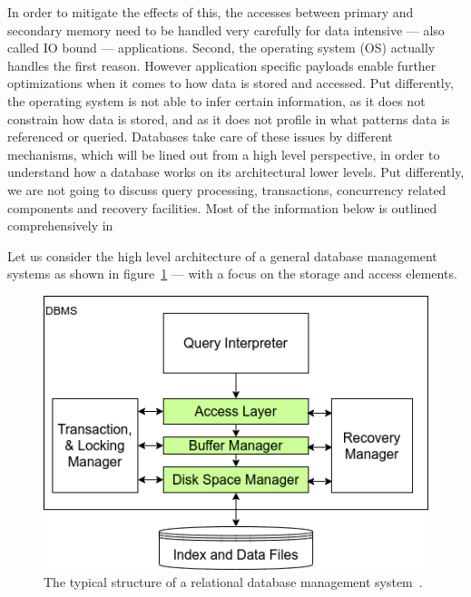     In order to mitigate the effects of this, the accesses between primary and secondary memory need to be handled very carefully for data intensive --- also called IO bound --- applications.
    Second, the operating system (OS) actually handles the first reason. 
    However application specific payloads enable further optimizations when it comes to how data is stored and accessed.
    Put differently, the operating system is not able to infer certain information, as it does not constrain how data is stored, and as it does not profile in what patterns data is referenced or queried.
    Databases take care of these issues by different mechanisms, which will be lined out from a high level perspective, in order to understand how a database works on its architectural lower levels.
    Put differently, we are not going to discuss query processing, transactions, concurrency related components and recovery facilities.
    Most of the information below is outlined comprehensively in~\autocite{ramakrishnan2000database, silberschatz1997database}
    
    Let us consider the high level architecture of a general database management systems as shown in figure~\ref{dbms_arch} --- with a focus on the storage and access elements.

    \begin{figure}[htp]
    \begin{center}
    \includegraphics[keepaspectratio,width=.5\textwidth]{img/03-preliminaries/RDBMS.png}
    \end{center}
    \caption{The typical structure of a relational database management system~\autocite{ramakrishnan2000database}.}
    \label{dbms_arch}
    \end{figure}

